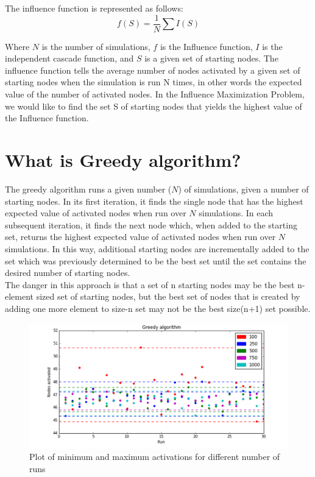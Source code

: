 \documentclass[11pt]{scrartcl} %
\begin{document}
The influence function is represented as follows:
\begin{equation}
f(S) = \frac{1}{N} \sum I(S)
\end{equation}

Where $N$ is the number of simulations, $f$ is the Influence function, $I$ is the independent cascade function, and $S$ is a given set of starting nodes.  The influence function tells the average number of nodes activated by a given set of starting nodes when the simulation is run N times, in other words the expected value of the number of activated nodes.  In the Influence Maximization Problem, we would like to find the set S of starting nodes that yields the highest value of the Influence function.    


\section{What is Greedy algorithm?}

The greedy algorithm runs a given number ($N$) of simulations, given a number of starting nodes.  In its first iteration, it finds the single node that has the highest expected value of activated nodes when run over $N$ simulations.  In each subsequent iteration, it finds the next node which, when added to the starting set, returns the highest expected value of activated nodes when run over $N$ simulations.  In this way, additional starting nodes are incrementally added to the set which was previously determined to be the best set until the set contains the desired number of starting nodes.\\ 
	
The danger in this approach is that a set of n starting nodes may be the best n-element sized set of starting nodes, but the best set of nodes that is created by adding one more element to size-n set may not be the best size(n+1) set possible.  

\begin{figure}[h!]
\centering
\includegraphics[width=15 cm]{greedy_min}
\caption{Plot of minimum and maximum activations for different number of runs}
\label{fig:GA}
\end{figure}
\end{document}
